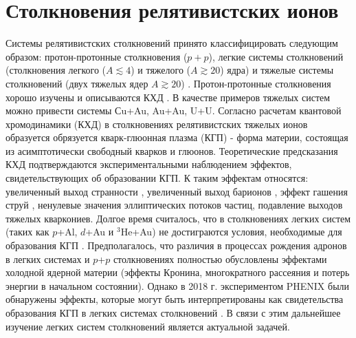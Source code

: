 
\chapter{Столкновения релятивистских ионов} \label{ch:ch1}
Системы релятивистских столкновений принято классифицировать следующим образом: протон-протонные столкновения ($p+p$), легкие системы столкновений (столкновения легкого ($A \lesssim 4$) и тяжелого ($A \gtrsim 20$) ядра) и тяжелые системы столкновений (двух тяжелых ядер $A \gtrsim 20$) \cite{QGP, Shmatov}. Протон-протонные столкновения хорошо изучены и описываются КХД \cite{CH_pp,PHENIX_Nature}. В качестве примеров тяжелых систем можно привести системы Сu+Au, Au+Au, U+U. Согласно расчетам квантовой хромодинамики (КХД) в столкновениях релятивистских тяжелых ионов образуется обрязуется кварк-глюонная плазма (КГП) - форма материи, состоящая из асимптотически свободный кварков и глюонов. Теоретические предсказания КХД подтверждаются экспериментальными наблюдением эффектов, свидетельствующих об образовании КГП. К таким эффектам относятся: увеличенный выход странности \cite{StrangEnh, Strangeness_QGP}, увеличенный выход барионов \cite{BaryonPuzzleHeavy,p2piRatio_2003,p2piRatio_130GeV}, эффект гашения струй \cite{JetQuenching1, JetQuenching2, JetQuenching3}, ненулевые значения эллиптических потоков частиц, подавление выходов тяжелых кваркониев. Долгое время считалось, что в столкновениях легких систем (таких как $p$+Al, $d$+Au и $^3$He+Au) не достиграются условия, необходимые для образования КГП \cite{CNM, PHENIX_Nature}. Предполагалось, что различия в процессах рождения адронов в легких системах и $p$+$p$ столкновениях полностью обусловлены эффектами холодной ядерной материи \cite{CNM} (эффекты Кронина, многократного рассеяния и потерь энергии в начальном состоянии). Однако в 2018 г. экспериментом PHENIX были обнаружены эффекты, которые могут быть интерпретированы как свидетельства образования КГП в легких системах столкновений \cite{PHENIX_Nature}. В связи с этим дальнейшее изучение легких систем столкновений является актуальной задачей. 

